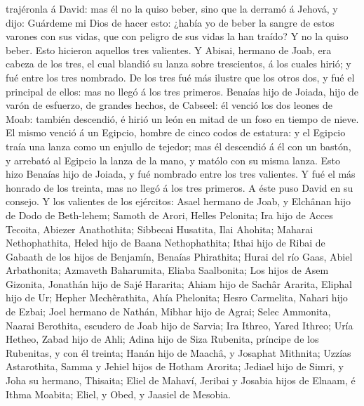 trajéronla á David: mas él no la quiso beber, sino que la derramó á
Jehová, y dijo:  Guárdeme mi Dios de hacer esto: ¿había
yo de beber la sangre de estos varones con sus vidas, que con peligro de
sus vidas la han traído? Y no la quiso beber. Esto hicieron aquellos
tres valientes.  Y Abisai, hermano de Joab, era cabeza de
los tres, el cual blandió su lanza sobre trescientos, á los cuales
hirió; y fué entre los tres nombrado.  De los tres fué
más ilustre que los otros dos, y fué el principal de ellos: mas no llegó
á los tres primeros.  Benaías hijo de Joiada, hijo de
varón de esfuerzo, de grandes hechos, de Cabseel: él venció los dos
leones de Moab: también descendió, é hirió un león en mitad de un foso
en tiempo de nieve.  El mismo venció á un Egipcio, hombre
de cinco codos de estatura: y el Egipcio traía una lanza como un enjullo
de tejedor; mas él descendió á él con un bastón, y arrebató al Egipcio
la lanza de la mano, y matólo con su misma lanza.  Esto
hizo Benaías hijo de Joiada, y fué nombrado entre los tres valientes.
 Y fué el más honrado de los treinta, mas no llegó á los
tres primeros. A éste puso David en su consejo.  Y los
valientes de los ejércitos: Asael hermano de Joab, y Elchânan hijo de
Dodo de Beth-lehem;  Samoth de Arori, Helles Pelonita;
 Ira hijo de Acces Tecoita, Abiezer Anathothita;
 Sibbecai Husatita, Ilai Ahohita;  Maharai
Nethophathita, Heled hijo de Baana Nethophathita;  Ithai
hijo de Ribai de Gabaath de los hijos de Benjamín, Benaías Phirathita;
 Hurai del río Gaas, Abiel Arbathonita; 
Azmaveth Baharumita, Eliaba Saalbonita;  Los hijos de
Asem Gizonita, Jonathán hijo de Sajé Hararita;  Ahiam
hijo de Sachâr Ararita, Eliphal hijo de Ur;  Hepher
Mechêrathita, Ahía Phelonita;  Hesro Carmelita, Nahari
hijo de Ezbai;  Joel hermano de Nathán, Mibhar hijo de
Agrai;  Selec Ammonita, Naarai Berothita, escudero de
Joab hijo de Sarvia;  Ira Ithreo, Yared Ithreo;
 Uría Hetheo, Zabad hijo de Ahli;  Adina
hijo de Siza Rubenita, príncipe de los Rubenitas, y con él treinta;
 Hanán hijo de Maachâ, y Josaphat Mithnita;
 Uzzías Astarothita, Samma y Jehiel hijos de Hotham
Arorita;  Jediael hijo de Simri, y Joha su hermano,
Thisaita;  Eliel de Mahaví, Jeribai y Josabia hijos de
Elnaam, é Ithma Moabita;  Eliel, y Obed, y Jaasiel de
Mesobia.

